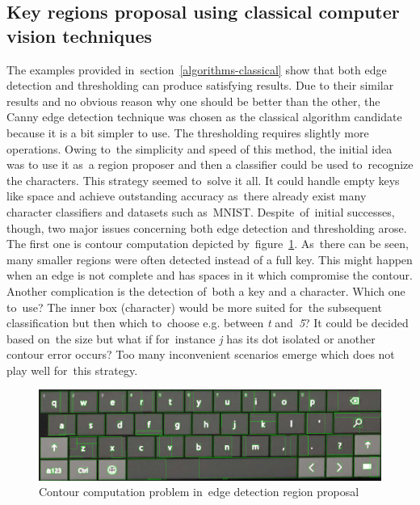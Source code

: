\subsection{Key regions proposal using classical computer vision techniques}
\label{design-classical-algorithms}
The examples provided in~section~\ref{algorithms-classical} show that both edge detection and thresholding can produce satisfying results. Due to their similar results and no obvious reason why one should be better than the other, the Canny edge detection technique was chosen as the classical algorithm candidate because it is a bit simpler to use. The thresholding requires slightly more operations. Owing to~the simplicity and speed of this method, the initial idea was to use it as~a region proposer and then a classifier could be used to~recognize the characters. This strategy seemed to~solve it all. It could handle empty keys like space and achieve outstanding accuracy as~there already exist many character classifiers and datasets such as~MNIST. Despite~of~initial successes, though, two major issues concerning both edge detection and thresholding arose. The first one is contour computation depicted by~figure~\ref{canny-countour-problem}. As~there can be seen, many smaller regions were often detected instead of a full key. This might happen when an edge is not complete and has spaces in it which compromise the contour. Another complication is the detection of~both a key and a character. Which one to~use? The inner box (character) would be more suited for~the subsequent classification but then which to~choose e.g. between \emph{t} and~\emph{5}? It could be decided based on~the size but what if for~instance \emph{j} has its dot isolated or another contour error occurs? Too many inconvenient scenarios emerge which does not play well for~this strategy.

\begin{figure}[hbt]
    \includegraphics[width=1\textwidth]{img/design/canny-contour-problem.png}
    \caption{Contour computation problem in~edge detection region proposal}
    \label{canny-countour-problem}
\end{figure}

